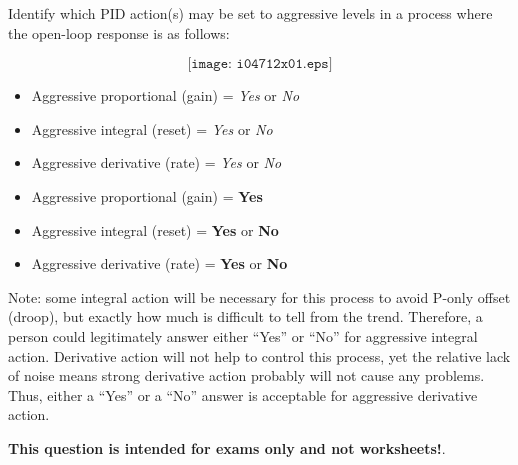 

Identify which PID action(s) may be set to aggressive levels in a process where the open-loop response is as follows:

$$\texttt{[image: i04712x01.eps]}$$

\begin{itemize}
\item{} Aggressive proportional (gain) = {\it Yes} or {\it No}
\vskip 10pt
\item{} Aggressive integral (reset) = {\it Yes} or {\it No} 
\vskip 10pt
\item{} Aggressive derivative (rate) = {\it Yes} or {\it No} 
\end{itemize}







\begin{itemize}
\item{} Aggressive proportional (gain) = {\bf Yes}
\vskip 10pt
\item{} Aggressive integral (reset) = {\bf Yes} or {\bf No} 
\vskip 10pt
\item{} Aggressive derivative (rate) = {\bf Yes} or {\bf No} 
\end{itemize}

Note: some integral action will be necessary for this process to avoid P-only offset (droop), but exactly how much is difficult to tell from the trend.  Therefore, a person could legitimately answer either ``Yes'' or ``No'' for aggressive integral action.  Derivative action will not help to control this process, yet the relative lack of noise means strong derivative action probably will not cause any problems.  Thus, either a ``Yes'' or a ``No'' answer is acceptable for aggressive derivative action.







{\bf This question is intended for exams only and not worksheets!}.


